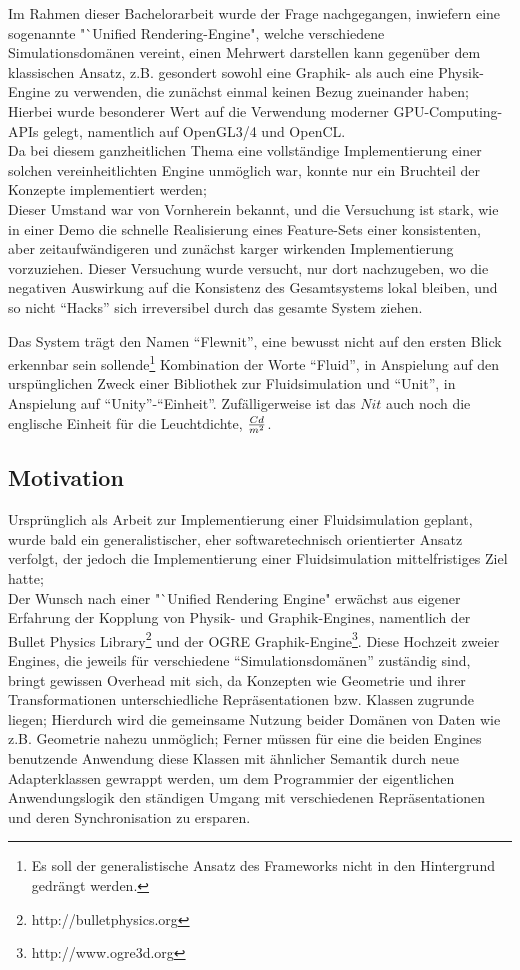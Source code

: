 

Im Rahmen dieser Bachelorarbeit wurde der Frage nachgegangen, inwiefern eine sogenannte "`Unified Rendering-Engine", welche verschiedene Simulationsdomänen vereint, einen Mehrwert darstellen kann gegenüber dem klassischen Ansatz, z.B. gesondert sowohl eine Graphik- als auch eine Physik-Engine zu verwenden, die zunächst einmal keinen
Bezug zueinander haben;\\

Hierbei wurde besonderer Wert auf die Verwendung moderner GPU-Computing-APIs gelegt, namentlich auf OpenGL3/4 und OpenCL.\\
Da bei diesem ganzheitlichen Thema eine vollständige Implementierung einer solchen vereinheitlichten Engine unmöglich war,
konnte nur ein Bruchteil der Konzepte implementiert werden;\\
Dieser Umstand war von Vornherein bekannt, und die Versuchung ist stark, wie in einer Demo die schnelle Realisierung eines Feature-Sets einer konsistenten, aber zeitaufwändigeren und zunächst karger wirkenden Implementierung vorzuziehen.
Dieser Versuchung wurde versucht, nur dort nachzugeben, wo die negativen Auswirkung auf die Konsistenz des Gesamtsystems lokal bleiben, und so nicht "`Hacks"' sich irreversibel durch das gesamte System ziehen.

Das System trägt den Namen "`Flewnit"', eine bewusst nicht auf den ersten Blick erkennbar sein sollende\footnote{Es soll der generalistische Ansatz des Frameworks nicht in den Hintergrund gedrängt werden.} Kombination der Worte "`Fluid"', in Anspielung auf den urspünglichen Zweck einer Bibliothek zur Fluidsimulation und "`Unit"', in Anspielung auf "`Unity"'-"`Einheit"'. Zufälligerweise ist das $Nit$ auch noch die englische Einheit für die Leuchtdichte, $Cd \over m^2$.


\subsection{Motivation}

Ursprünglich als Arbeit zur Implementierung einer Fluidsimulation geplant, wurde bald ein generalistischer, eher softwaretechnisch orientierter Ansatz verfolgt, der jedoch die Implementierung einer Fluidsimulation mittelfristiges Ziel hatte;\\
Der Wunsch nach einer "`Unified Rendering Engine" erwächst aus eigener Erfahrung der Kopplung von Physik- und Graphik-Engines, namentlich der Bullet Physics Library\footnote{http://bulletphysics.org} und der OGRE Graphik-Engine\footnote{http://www.ogre3d.org}. Diese Hochzeit zweier Engines, die jeweils für verschiedene "`Simulationsdomänen"' zuständig sind, bringt gewissen Overhead mit sich, da Konzepten wie  Geometrie und ihrer Transformationen unterschiedliche Repräsentationen bzw. Klassen zugrunde liegen;
Hierdurch wird die gemeinsame Nutzung beider Domänen von Daten wie z.B. Geometrie nahezu unmöglich; Ferner müssen für eine die beiden Engines benutzende Anwendung diese Klassen mit ähnlicher Semantik durch neue Adapterklassen gewrappt werden,
um dem Programmier der eigentlichen Anwendungslogik den ständigen Umgang mit verschiedenen Repräsentationen und deren Synchronisation zu ersparen.\\

